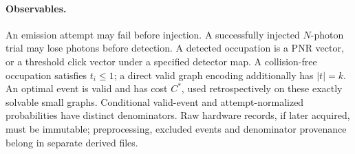 \documentclass[11pt,a4paper]{article}
\theoremstyle{remark}\newtheorem{remark}[theorem]{Remark}
\begin{document}
\paragraph{Observables.}
An emission attempt may fail before injection. A successfully injected $N$-photon trial may lose photons before detection. A detected occupation is a PNR vector, or a threshold click vector under a specified detector map. A collision-free occupation satisfies $t_i\le1$; a direct valid graph encoding additionally has $|t|=k$. An optimal event is valid and has cost $C^*$, used retrospectively on these exactly solvable small graphs. Conditional valid-event and attempt-normalized probabilities have distinct denominators. Raw hardware records, if later acquired, must be immutable; preprocessing, excluded events and denominator provenance belong in separate derived files.
\end{document}

